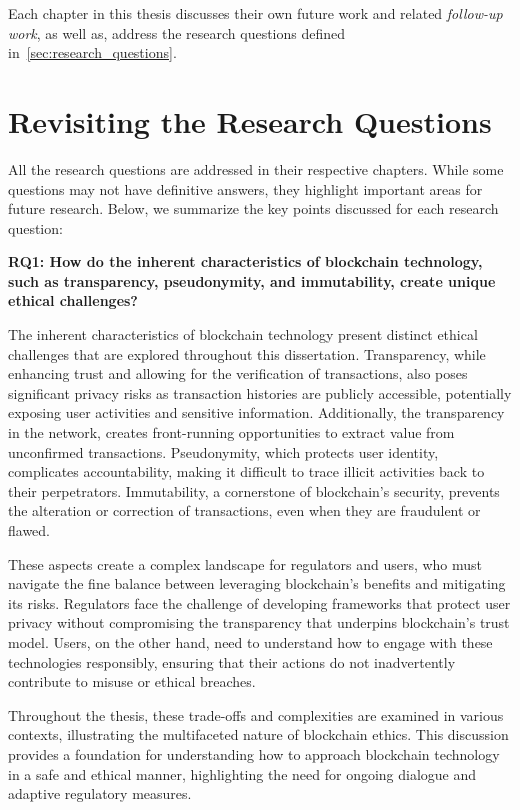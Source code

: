 Each chapter in this thesis discusses their own future work and related \textit{follow-up work}, as well as, address the research questions defined in~\ref{sec:research_questions}. 

\section{Revisiting the Research Questions}

All the research questions are addressed in their respective chapters. While some questions may not have definitive answers, they highlight important areas for future research. Below, we summarize the key points discussed for each research question:


\textbf{RQ1: How do the inherent characteristics of blockchain technology, such as transparency, pseudonymity, and immutability, create unique ethical challenges?}

The inherent characteristics of blockchain technology present distinct ethical challenges that are explored throughout this dissertation. Transparency, while enhancing trust and allowing for the verification of transactions, also poses significant privacy risks as transaction histories are publicly accessible, potentially exposing user activities and sensitive information. Additionally, the transparency in the network, creates front-running opportunities to extract value from unconfirmed transactions. Pseudonymity, which protects user identity, complicates accountability, making it difficult to trace illicit activities back to their perpetrators. Immutability, a cornerstone of blockchain's security, prevents the alteration or correction of transactions, even when they are fraudulent or flawed.

These aspects create a complex landscape for regulators and users, who must navigate the fine balance between leveraging blockchain's benefits and mitigating its risks. Regulators face the challenge of developing frameworks that protect user privacy without compromising the transparency that underpins blockchain's trust model. Users, on the other hand, need to understand how to engage with these technologies responsibly, ensuring that their actions do not inadvertently contribute to misuse or ethical breaches.

Throughout the thesis, these trade-offs and complexities are examined in various contexts, illustrating the multifaceted nature of blockchain ethics. This discussion provides a foundation for understanding how to approach blockchain technology in a safe and ethical manner, highlighting the need for ongoing dialogue and adaptive regulatory measures.


